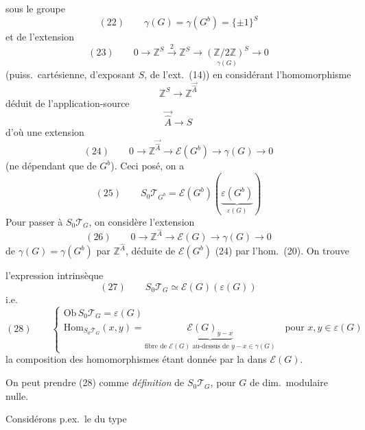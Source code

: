 \documentclass[11pt,a4paper]{article}
\begin{document}
 sous le groupe
\[
  (22) \qquad \gamma(G) = \gamma(G^b) = \{\pm 1\}^S
\]
et de l'extension
\[
  (23) \qquad 0 \to \mathbb{Z}^S \xrightarrow{\ 2\ } \mathbb{Z}^S \to \underset{\gamma(G)}{(\mathbb{Z}/2\mathbb{Z})^S} \to 0
\]
(puiss.\ cartésienne, d'exposant $S$, de l'ext.\ (14)) en considérant l'homomorphisme
\[
  \mathbb{Z}^S \longrightarrow \mathbb{Z}^{\vec{\hat A}}
\]
déduit de l'application-source
\[
  \vec{\hat A} \longrightarrow S
\]
d'où une extension
\[
  (24) \qquad 0 \to \mathbb{Z}^{\vec{\hat A}} \longrightarrow \mathcal{E}(G^b) \longrightarrow \gamma(G) \to 0
\]
(ne dépendant que de $G^b$). Ceci posé, on a
\[
  (25) \qquad S_0\mathcal{T}_{G^b} = \mathcal{E}(G^b)(\underbrace{\varepsilon(G^b)}_{\varepsilon(G)})
\]
Pour passer à $S_0\mathcal{T}_G$, on considère l'extension
\[
  (26) \qquad 0 \to \mathbb{Z}^{\hat A} \longrightarrow \mathcal{E}(G) \longrightarrow \gamma(G) \to 0
\]
de $\gamma(G) = \gamma(G^b)$ par $\mathbb{Z}^{\hat A}$, déduite de $\mathcal{E}(G^b)$ (24) par l'hom.\ (20). On trouve

l'expression intrinsèque
\[
  (27) \qquad S_0\mathcal{T}_G \simeq \mathcal{E}(G)(\varepsilon(G))
\]
i.e.
\[
  (28) \qquad
  \begin{cases}
    \mathrm{Ob}\, S_0\mathcal{T}_G = \varepsilon(G) \\
    \mathrm{Hom}_{S_0\mathcal{T}_G}(x,y) = \underbrace{\mathcal{E}(G)_{y-x}}_{\text{fibre de $\mathcal{E}(G)$ au-dessus de $y - x \in \gamma(G)$}}
    \quad \text{pour } x, y \in \varepsilon(G)
  \end{cases}
\]
la composition des homomorphismes étant donnée par la \struck{\ill{}}  dans $\mathcal{E}(G)$.


On peut prendre (28) comme \textit{définition} de $S_0\mathcal{T}_G$, pour $G$ de dim.\ modulaire nulle.

Considérons p.ex.\ le \struck{\ill{}}  du type

\end{document}
